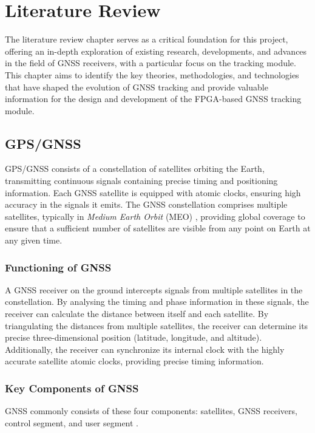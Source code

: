 \chapter{Literature Review}
The literature review chapter serves as a critical foundation for this project, offering an in-depth exploration of existing research, developments, and advances in the field of GNSS receivers, with a particular focus on the tracking module. This chapter aims to identify the key theories, methodologies, and technologies that have shaped the evolution of GNSS tracking and provide valuable information for the design and development of the FPGA-based GNSS tracking module.

\section{GPS/GNSS}
GPS/GNSS consists of a constellation of satellites orbiting the Earth, transmitting continuous signals containing precise timing and positioning information. Each GNSS satellite is equipped with atomic clocks, ensuring high accuracy in the signals it emits. The GNSS constellation comprises multiple satellites, typically in \textit{Medium Earth Orbit} (MEO) \cite{RN187}, providing global coverage to ensure that a sufficient number of satellites are visible from any point on Earth at any given time.

\subsection{Functioning of GNSS}

A GNSS receiver on the ground intercepts signals from multiple satellites in the constellation. By analysing the timing and phase information in these signals, the receiver can calculate the distance between itself and each satellite. By triangulating the distances from multiple satellites, the receiver can determine its precise three-dimensional position (latitude, longitude, and altitude). Additionally, the receiver can synchronize its internal clock with the highly accurate satellite atomic clocks, providing precise timing information.

\subsection{Key Components of GNSS}
GNSS commonly consists of these four components: satellites, GNSS receivers, control segment, and user segment \cite{RN188}.

